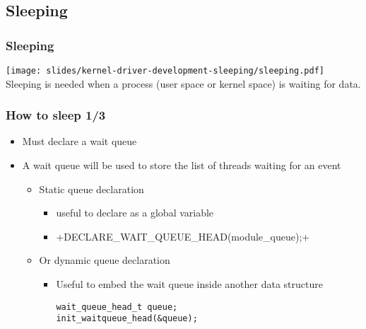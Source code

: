 \subsection{Sleeping}

\begin{frame}
  \frametitle{Sleeping}
  \begin{center}
    \texttt{[image: slides/kernel-driver-development-sleeping/sleeping.pdf]}\\
    Sleeping is needed when a process (user space or kernel space) is
    waiting for data.
  \end{center}
\end{frame}

\begin{frame}[fragile]
  \frametitle{How to sleep 1/3}
  \begin{itemize}
  \item Must declare a wait queue
  \item A wait queue will be used to store the list of threads waiting for an event
    \begin{itemize}
    \item Static queue declaration
      \begin{itemize}
      \item useful to declare as a global variable
      \item {}+DECLARE_WAIT_QUEUE_HEAD(module_queue);+
      \end{itemize}
    \item Or dynamic queue declaration
      \begin{itemize}
      \item Useful to embed the wait queue inside another data
        structure
\begin{verbatim}
wait_queue_head_t queue;
init_waitqueue_head(&queue);
\end{verbatim}
      \end{itemize}
    \end{itemize}
  \end{itemize}
\end{frame}

